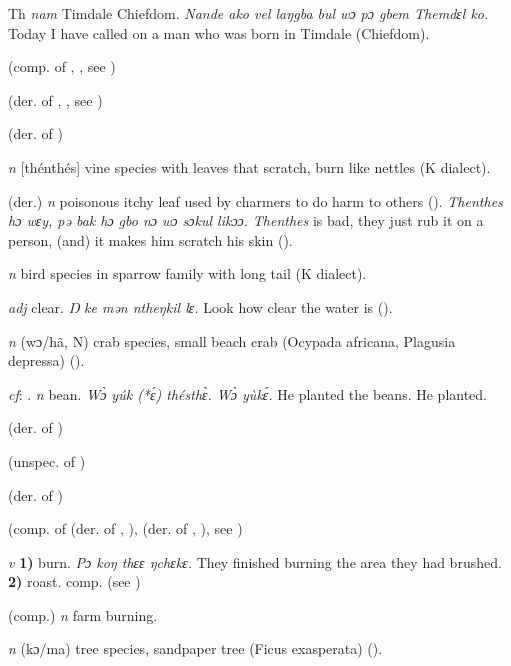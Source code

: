 \begin{letter}{Th}
 \textit{nam} Timdale Chiefdom. \textit{Nande ako vel laŋgba bul wɔ pɔ gbem Themdɛl ko.} Today I have called on a man who was born in Timdale (Chiefdom).

 (comp. of , , see ) 

 (der. of , , see )

 (der. of ) 

 \textit{n} [thénthés] vine species with leaves that scratch, burn like nettles (K dialect).

 (der.) \textit{n} poisonous itchy leaf used by charmers to do harm to others (\citealt{Pichl1967}). \textit{Thenthes hɔ wɛy, pə bak hɔ gbo nɔ wɔ sɔkul likɔɔ.} \textit{Thenthes} is bad, they just rub it on a person, (and) it makes him scratch his skin (\citealt{Pichl1967}). 

 \textit{n} bird species in sparrow family with long tail (K dialect).

 \textit{adj} clear. \textit{Ŋ ke mən ntheŋkil lɛ.} Look how clear the water is (\citealt{Pichl1967}).

 \textit{n} (wɔ/hã, N) crab species, small beach crab (Ocypada africana, Plagusia depressa) (\citealt{Pichl1967}). 

 \textit{cf}: . \textit{n} bean. \textit{Wɔ̀ yúk (*ɛ́) thésthɛ̀. Wɔ̀ yùkɛ́.} He planted the beans. He planted.

 (der. of )

 (unspec. of )

 (der. of )

 (comp. of  (der. of , ),  (der. of , ), see ) 

 \textit{v} \textbf{1)} burn. \textit{Pɔ koŋ thɛɛ ŋchɛkɛ.} They finished burning the area they had brushed. \textbf{2)} roast. comp.  (see ) 

 (comp.) \textit{n} farm burning.

 \textit{n} (kɔ/ma) tree species, sandpaper tree (Ficus exasperata) (\citealt{Pichl1967}). 


\end{letter}
